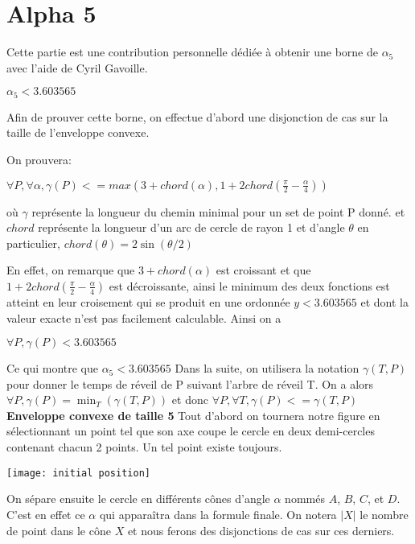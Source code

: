 \section{Alpha 5}

Cette partie est une contribution personnelle dédiée à obtenir une borne de $\alpha_5$ avec l'aide de Cyril Gavoille.

\(\alpha_5 < 3.603565\)

Afin de prouver cette borne, on effectue d'abord une disjonction de cas sur la taille de l'enveloppe convexe.

On prouvera:

\(\forall P, \forall \alpha, \gamma(P) <= max(3 + chord(\alpha), 1 + 2chord(\frac{\pi}{2} - \frac{\alpha}{4})) \)

où $\gamma$ représente la longueur du chemin minimal pour un set de point P donné. et $chord$ représente la longueur d'un arc de cercle de rayon 1 et d'angle $\theta$ en particulier, $chord(\theta) = 2\sin(\theta/2)$

En effet, on remarque que $3+chord(\alpha)$ est croissant et que $1 + 2chord(\frac{\pi}{2} - \frac{\alpha}{4})$ est décroissante, ainsi le minimum des deux fonctions est atteint en leur croisement qui se produit en une ordonnée $y < 3.603565$ et dont la valeur exacte n'est pas facilement calculable. Ainsi on a

\(\forall P, \gamma(P) < 3.603565\)

Ce qui montre que $\alpha_5 < 3.603565$
\newline
\newline
Dans la suite, on utilisera la notation $\gamma(T, P)$ pour donner le temps de réveil de P suivant l'arbre de réveil T.
On a alors $\forall P, \gamma(P) = \min_T(\gamma(T,P))$
et donc $\forall P, \forall T, \gamma(P) <= \gamma(T, P)$
\newline
\newline
\textbf{\Large{Enveloppe convexe de taille 5}}
\newline
\newline
Tout d'abord on tournera notre figure en sélectionnant un point tel que son axe coupe le cercle en deux demi-cercles contenant chacun 2 points. Un tel point existe toujours.

\texttt{[image: initial position]}

On sépare ensuite le cercle en différents cônes d'angle $\alpha$ nommés $A$, $B$, $C$, et $D$. C'est en effet ce $\alpha$ qui apparaîtra dans la formule finale. On notera $|X|$ le nombre de point dans le cône $X$ et nous ferons des disjonctions de cas sur ces derniers.

